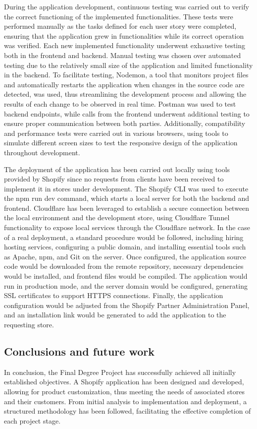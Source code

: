 \documentclass[11pt]{article}
\begin{document}
During the application development, continuous testing was carried out to verify the correct functioning 
of the implemented functionalities. These tests were performed manually as the tasks defined for each user story were completed,
ensuring that the application grew in functionalities while its correct operation was verified. Each new implemented functionality
underwent exhaustive testing both in the frontend and backend. Manual testing was chosen over automated testing due to the relatively
small size of the application and limited functionality in the backend. To facilitate testing, Nodemon, a tool that monitors project files 
and automatically restarts the application when changes in the source code are detected, was used, thus streamlining the development process 
and allowing the results of each change to be observed in real time. Postman was used to test backend endpoints, while calls from the frontend 
underwent additional testing to ensure proper communication between both parties. Additionally, compatibility and performance tests were carried 
out in various browsers, using tools to simulate different screen sizes to test the responsive design of the application throughout development.

The deployment of the application has been carried out locally using tools provided by Shopify since no requests from clients have 
been received to implement it in stores under development. The Shopify CLI was used to execute the npm run dev command, which starts 
a local server for both the backend and frontend. Cloudflare has been leveraged to establish a secure connection between the local 
environment and the development store, using Cloudflare Tunnel functionality to expose local services through the Cloudflare network. 
In the case of a real deployment, a standard procedure would be followed, including hiring hosting services, configuring a public domain, 
and installing essential tools such as Apache, npm, and Git on the server. Once configured, the application source code would be downloaded 
from the remote repository, necessary dependencies would be installed, and frontend files would be compiled. The application would run in 
production mode, and the server domain would be configured, generating SSL certificates to support HTTPS connections. Finally, the application 
configuration would be adjusted from the Shopify Partner Administration Panel, and an installation link would be generated to add the application 
to the requesting store.

\subsection{Conclusions and future work }
In conclusion, the Final Degree Project has successfully achieved all initially established objectives. A Shopify application has been 
designed and developed, allowing for product customization, thus meeting the needs of associated stores and their customers. From initial 
analysis to implementation and deployment, a structured methodology has been followed, facilitating the effective completion of each project stage.
\end{document}
